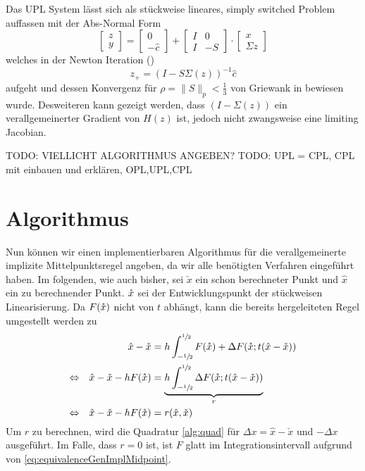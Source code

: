 Das UPL System lässt sich als stückweise lineares, simply switched Problem auffassen mit der Abs-Normal Form
\[
 \begin{bmatrix}
  z\\
  y
 \end{bmatrix}
=
 \begin{bmatrix}
  0\\
  -\hat c
 \end{bmatrix}
+
 \begin{bmatrix}
  I & 0\\
  I & -S
 \end{bmatrix}
\cdot
 \begin{bmatrix}
  x\\
  \Sigma z
 \end{bmatrix}
\]
welches in der Newton Iteration (\cite[S.20]{plan})
\begin{equation}
\label{eq:unfoldedNewton}
 z_+ = (I-S\Sigma(z))^{-1}\hat c
\end{equation}
aufgeht und dessen Konvergenz für $\rho = \|S\|_p <\frac{1}{3}$ von Griewank in \cite[Prop. 7.3]{plan} bewiesen wurde. 
Desweiteren kann gezeigt werden, dass $(I-\Sigma(z))$ ein verallgemeinerter Gradient von $H(z)$ ist, jedoch nicht zwangsweise eine limiting Jacobian.
 
TODO: VIELLICHT ALGORITHMUS ANGEBEN?
TODO: UPL = CPL, CPL mit einbauen und erklären, OPL,UPL,CPL

\section{Algorithmus}
Nun können wir einen implementierbaren Algorithmus für die verallgemeinerte implizite Mittelpunktsregel angeben, da wir alle benötigten Verfahren eingeführt haben. Im folgenden, wie auch bisher, sei $\check x$ ein schon berechneter Punkt und $\hat x$ ein zu berechnender Punkt. $\mathring{x}$ sei der Entwicklungspunkt der stückweisen Linearisierung. Da $F(\mathring{x})$ nicht von $t$ abhängt, kann die bereits hergeleiteten Regel umgestellt werden zu 
\begin{equation}
\label{eq:genMidpointAlg}
\begin{aligned}
 && \hat x - \check x &= h\int_{-\sfrac{1}{2}}^{\sfrac{1}{2}}F(\mathring{x})+ \Delta F(\mathring{x};t(\hat x - \check x)) \\
 \Leftrightarrow && \hat x - \check x - hF(\mathring{x}) & =\underbrace{h \int_{-\sfrac{1}{2}}^{\sfrac{1}{2}} \Delta F(\mathring{x};t(\hat x - \check x))}_{r} \\
 \Leftrightarrow && \hat x - \check x - hF(\mathring{x}) & =r(\hat x,\check x)
\end{aligned}
\end{equation}
Um $r$ zu berechnen, wird die Quadratur \ref{alg:quad} für $\Delta x = \hat x - \check x$ und $-\Delta x$ ausgeführt. Im Falle, dass $r=0$ ist, ist $F$ glatt im Integrationsintervall aufgrund von \eqref{eq:equivalenceGenImplMidpoint}.

